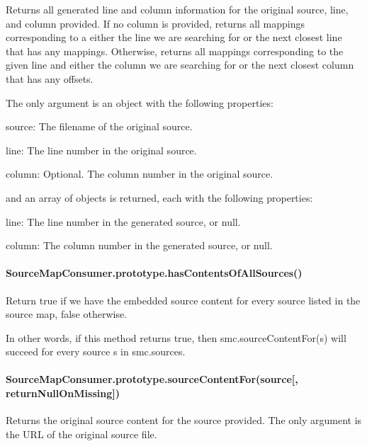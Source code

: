 Returns all generated line and column information for the original source, line, and column provided. If no column is provided, returns all mappings corresponding to a either the line we are searching for or the next closest line that has any mappings. Otherwise, returns all mappings corresponding to the given line and either the column we are searching for or the next closest column that has any offsets.

The only argument is an object with the following properties\+:


\begin{DoxyItemize}
\item {\ttfamily source}\+: The filename of the original source.
\item {\ttfamily line}\+: The line number in the original source.
\item {\ttfamily column}\+: Optional. The column number in the original source.
\end{DoxyItemize}

and an array of objects is returned, each with the following properties\+:


\begin{DoxyItemize}
\item {\ttfamily line}\+: The line number in the generated source, or null.
\item {\ttfamily column}\+: The column number in the generated source, or null.
\end{DoxyItemize}

\paragraph*{Source\+Map\+Consumer.\+prototype.\+has\+Contents\+Of\+All\+Sources()}

Return true if we have the embedded source content for every source listed in the source map, false otherwise.

In other words, if this method returns {\ttfamily true}, then {\ttfamily smc.\+source\+Content\+For(s)} will succeed for every source {\ttfamily s} in {\ttfamily smc.\+sources}.

\paragraph*{Source\+Map\+Consumer.\+prototype.\+source\+Content\+For(source\mbox{[}, return\+Null\+On\+Missing\mbox{]})}

Returns the original source content for the source provided. The only argument is the U\+RL of the original source file.

